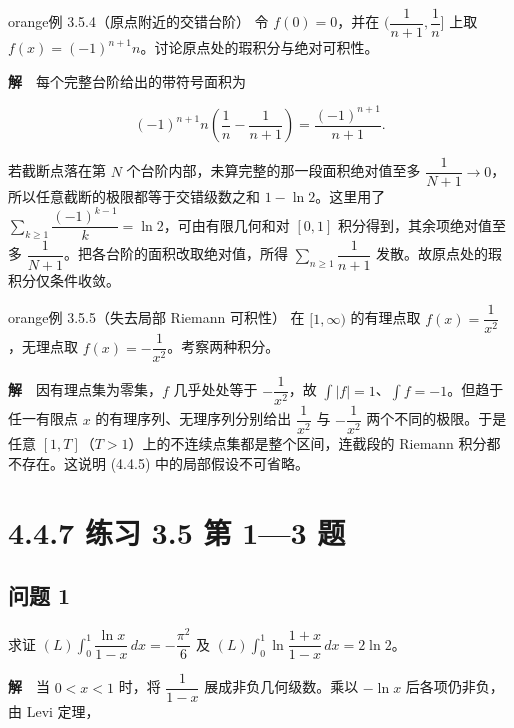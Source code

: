 \documentclass[11pt,a4paper]{article}
\begin{document}
\begin{sboxenv}{orange}{例 3.5.4（原点附近的交错台阶）}
令 \(f(0)=0\)，并在 \((\dfrac1{n+1},\dfrac1n]\) 上取
\(f(x)=(-1)^{n+1}n\)。讨论原点处的瑕积分与绝对可积性。

\end{sboxenv}

\textbf{解}　每个完整台阶给出的带符号面积为

\begin{equation*}
(-1)^{n+1}n\left(\frac1n-\frac1{n+1}\right)
=\frac{(-1)^{n+1}}{n+1}.
\end{equation*}

若截断点落在第 \(N\) 个台阶内部，未算完整的那一段面积绝对值至多
\(\dfrac1{N+1}\to0\)，所以任意截断的极限都等于交错级数之和
\(1-\ln2\)。这里用了
\(\sum_{k\ge1}\dfrac{(-1)^{k-1}}k=\ln2\)，可由有限几何和对 \([0,1]\)
积分得到，其余项绝对值至多
\(\dfrac1{N+1}\)。把各台阶的面积改取绝对值，所得
\(\sum_{n\ge1}\dfrac1{n+1}\) 发散。故原点处的瑕积分仅条件收敛。

\begin{sboxenv}{orange}{例 3.5.5（失去局部 Riemann 可积性）}
在 \([1,\infty)\) 的有理点取 \(f(x)=\dfrac1{x^2}\)，无理点取
\(f(x)=-\dfrac1{x^2}\)。考察两种积分。

\end{sboxenv}

\textbf{解}　因有理点集为零集，\(f\) 几乎处处等于 \(-\dfrac1{x^2}\)，故
\(\int|f|=1\)、\(\int f=-1\)。但趋于任一有限点 \(x\)
的有理序列、无理序列分别给出 \(\dfrac1{x^2}\) 与 \(-\dfrac1{x^2}\)
两个不同的极限。于是任意
\([1,T]\)（\(T>1\)）上的不连续点集都是整个区间，连截段的 Riemann
积分都不存在。这说明 (4.4.5) 中的局部假设不可省略。

\section[\S{}4.4.7 练习 3.5 第 1---3
题]{4.4.7 练习 3.5 第 1---3
题}\label{ux7ec3ux4e60-3.5-ux7b2c-13-ux9898}

\subsection{问题 1}\label{ux95eeux9898-1}

求证 \((L)\int_0^1\dfrac{\ln x}{1-x}\,dx=-\dfrac{\pi^2}{6}\) 及
\((L)\int_0^1\ln\dfrac{1+x}{1-x}\,dx=2\ln2\)。

\textbf{解}　当 \(0<x<1\) 时，将 \(\dfrac1{1-x}\) 展成非负几何级数。乘以
\(-\ln x\) 后各项仍非负，由 Levi 定理，
\end{document}
